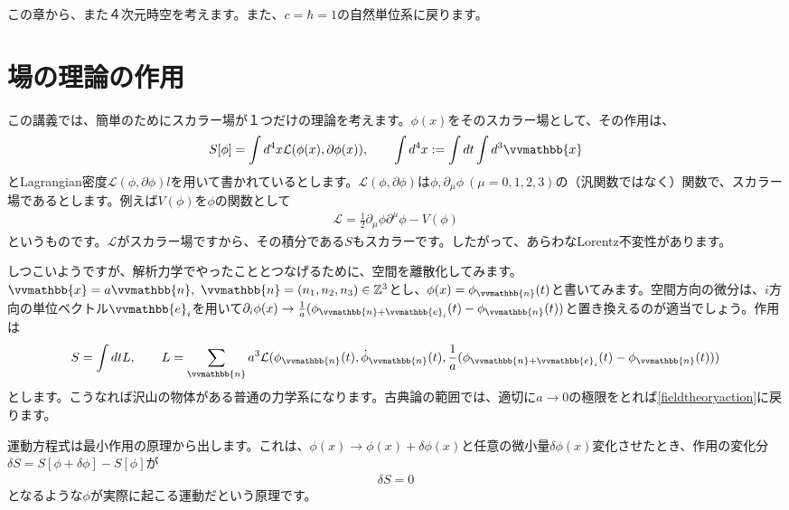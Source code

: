 \documentclass[report,paper=a4, fontsize=12pt, line_length=16cm, number_of_lines=33,dvipdfmx]{jlreq}
\numberwithin{equation}{chapter}
\newcommand{\del}{\partial}
\newcommand{\Zb}{\mathbb{Z}}
\newcommand{\xb}{\vvmathbb{x}}
\newcommand{\nb}{\vvmathbb{n}}
\newcommand{\eb}{\vvmathbb{e}}
\newcommand{\Lcal}{\mathcal{L}}
\begin{document}
この章から、また４次元時空を考えます。また、$c=\hbar=1$の自然単位系に戻ります。


\section{場の理論の作用}
この講義では、簡単のためにスカラー場が１つだけの理論を考えます。$\phi(x)$をそのスカラー場として、その作用は、
\begin{align}
  S[\phi]=\int d^4x \Lcal(\phi(x),\del\phi(x)),\qquad \int d^4x :=\int dt\int d^3\xb\label{fieldtheoryaction}
\end{align}
とLagrangian密度$\Lcal(\phi,\del\phi)l$を用いて書かれているとします。$\Lcal(\phi,\del\phi)$は$\phi,\del_{\mu}\phi\ (\mu=0,1,2,3)$の（汎関数ではなく）関数で、スカラー場であるとします。例えば$V(\phi)$を$\phi$の関数として
\begin{align}
  \Lcal=\frac12\del_{\mu}\phi \del^{\mu}\phi-V(\phi)
\end{align}
というものです。$\Lcal$がスカラー場ですから、その積分である$S$もスカラーです。したがって、あらわなLorentz不変性があります。

しつこいようですが、解析力学でやったこととつなげるために、空間を離散化してみます。$\xb=a\nb,\ \nb=(n_1,n_2,n_3)\in \Zb^3$とし、$\phi(x)=\phi_{\nb}(t)$と書いてみます。空間方向の微分は、$i$方向の単位ベクトル$\eb_i$を用いて$\del_i\phi(x)\to \frac{1}{a}(\phi_{\nb+\eb_i}(t)-\phi_{\nb}(t))$と置き換えるのが適当でしょう。作用は
\begin{align}
  S=\int dt L,\qquad L=\sum_{\nb}a^3 \Lcal(\phi_{\nb}(t),\dot{\phi}_{\nb}(t), \frac{1}{a}(\phi_{\nb+\eb_i}(t)-\phi_{\nb}(t)))
  \label{discreteaction}
\end{align}
とします。こうなれば沢山の物体がある普通の力学系になります。古典論の範囲では、適切に$a\to 0$の極限をとれば\eqref{fieldtheoryaction}に戻ります。

運動方程式は最小作用の原理から出します。これは、$\phi(x)\to \phi(x)+\delta\phi(x)$と任意の微小量$\delta\phi(x)$変化させたとき、作用の変化分$\delta S=S[\phi+\delta \phi]-S[\phi]$が
\begin{align}
  \delta S=0
\end{align}
となるような$\phi$が実際に起こる運動だという原理です。
\end{document}
